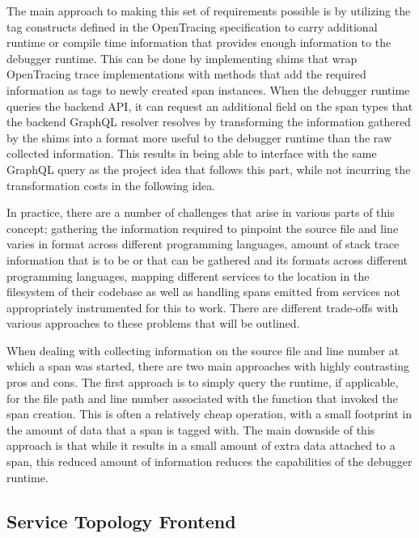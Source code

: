 \documentclass[12pt,pdftex,titlepage]{report}
\begin{document}
                The main approach to making this set of requirements possible is by utilizing the tag constructs defined in the OpenTracing specification to carry additional runtime or
                compile time information that provides enough information to the debugger runtime. This can be done by implementing shims that wrap OpenTracing trace implementations with
                methods that add the required information as tags to newly created span instances. When the debugger runtime queries the backend API, it can request an additional field on
                the span types that the backend GraphQL resolver resolves by transforming the information gathered by the shims into a format more useful to the debugger runtime than the
                raw collected information. This results in being able to interface with the same GraphQL query as the project idea that follows this part, while not incurring the 
                transformation costs in the following idea.

                In practice, there are a number of challenges that arise in various parts of this concept; gathering the information required to pinpoint the source file and line varies 
                in format across different programming languages, amount of stack trace information that is to be or that can be gathered and its formats across different programming 
                languages, mapping different services to the location in the filesystem of their codebase as well as handling spans emitted from services not appropriately instrumented 
                for this to work. There are different trade-offs with various approaches to these problems that will be outlined.

                When dealing with collecting information on the source file and line number at which a span was started, there are two main approaches with highly contrasting pros and cons.
                The first approach is to simply query the runtime, if applicable, for the file path and line number associated with the function that invoked the span creation. This is often
                a relatively cheap operation, with a small footprint in the amount of data that a span is tagged with. The main downside of this approach is that while it results in a small 
                amount of extra data attached to a span, this reduced amount of information reduces the capabilities of the debugger runtime.   

            \subsection{Service Topology Frontend}
\end{document}
